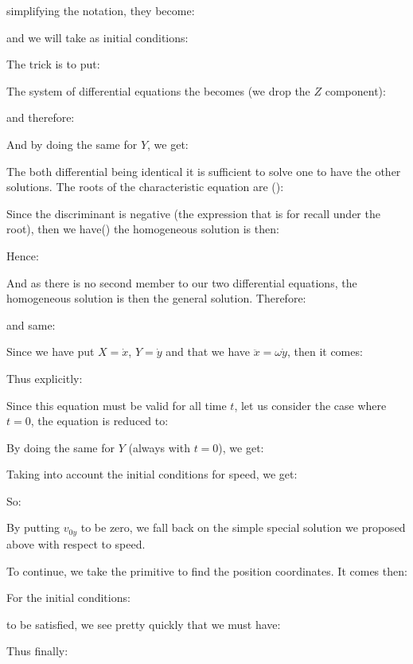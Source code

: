 	simplifying the notation, they become:
	
	and we will take as initial conditions:
	
	The trick is to put:
	
	The system of differential equations the becomes (we drop the $Z$ component):
	
	and therefore:
	
	And by doing the same for $Y$, we get:
	
	The both differential being identical it is sufficient to solve one to have the other solutions. The roots of the characteristic equation are ():
	
	Since the discriminant is negative (the expression that is for recall under the root), then we have() the homogeneous solution is then:
	
	Hence:
	
	And as there is no second member to our two differential equations, the homogeneous solution is then the general solution. Therefore:
	
	and same:
	
	Since we have put $X=\dot{x}$, $Y=\dot{y}$ and that we have $\ddot{x}=\omega\dot{y}$, then it comes:
	
	Thus explicitly:
	
	Since this equation must be valid for all time $t$, let us consider the case where $t = 0$, the equation is reduced to:
	
	By doing the same for $Y$ (always with $t = 0$), we get:
	
	Taking into account the initial conditions for speed, we get:
	
	So:
	
	\begin{tcolorbox}[title=Remark,colframe=black,arc=10pt]
	By putting $v_{0y}$ to be zero, we fall back on the simple special solution we proposed above with respect to speed.
	\end{tcolorbox}
	To continue, we take the primitive to find the position coordinates. It comes then:
	
	For the initial conditions:
	
	to be satisfied, we see pretty quickly that we must have:
	
	Thus finally:
	
